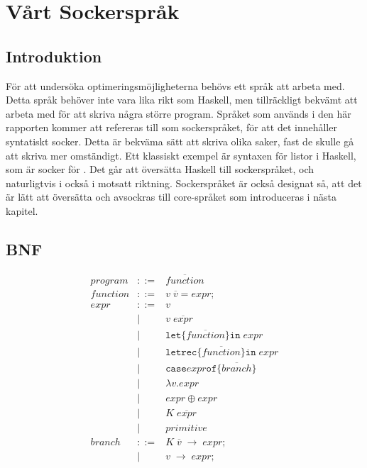 \documentclass[Rapport]{subfiles}
\begin{document}
\section{Vårt Sockerspråk}

%
%
%
%
%
%
%

%

\subsection{Introduktion}

För att undersöka optimeringsmöjligheterna behövs ett språk att arbeta med. 
Detta språk behöver inte vara lika rikt som Haskell, men tillräckligt bekvämt
att arbeta med för att skriva några större program. Språket som används i den
här rapporten kommer att refereras till som sockerspråket, för att det 
innehåller syntatiskt socker. Detta är bekväma sätt att skriva olika saker, 
fast de skulle gå att skriva mer omständigt. Ett klassiskt exempel är syntaxen
för listor i Haskell, \miniCode{[5,0,4]} som är socker för .
    Det går att översätta Haskell till sockerspråket, och naturligtvis i också
i motsatt riktning. Sockerspråket är också designat så, att det är lätt att
översätta och avsockras till core-språket som introduceras i nästa kapitel. 

\subsection{BNF}
\begin{align*}
program &::=& \overline{function} \\
function &::=& v \; \overline{v} \mathtt{=} expr \mathtt{;} \\
expr &::=& v \\
       &|& v \; \overline{expr}  \\
       &|& \mathtt{let \{} \overline{function} \mathtt{\} in }\; expr \\
       &|& \mathtt{letrec \{} \overline{function} \mathtt{\} in} \; expr \\
       &|& \mathtt{case} expr \mathtt{of \{} \overline{branch} \mathtt{\}} \\
       &|& \mathtt{\lambda } v \mathtt{.} expr \\
       &|& expr \oplus expr \\
       &|& K \; \overline{expr} \\
       &|& primitive \\
branch &::=& K \; \overline{v} \; \mathtt{\rightarrow} \; expr \mathtt{;} \\
         &|& v \; \mathtt{\rightarrow} \; expr \mathtt{;}
\end{align*}
\end{document}
